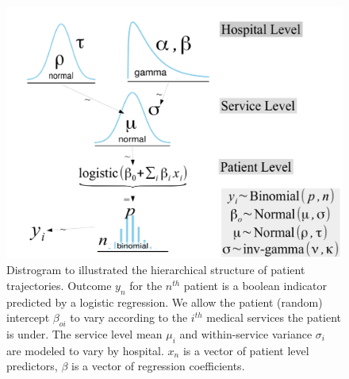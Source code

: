 \documentclass[11pt,notitlepage]{article}
\begin{document}
\begin{figure} %
 \vspace{-15pt}
 \includegraphics[scale=0.3]{Figures/Distrogram.pdf} 
  \vspace{-20pt}
 \caption{\footnotesize Distrogram to illustrated the hierarchical structure of patient trajectories. Outcome $y_n$ for the $n^{th}$ patient is a boolean indicator predicted by a logistic regression. We allow the patient (random) intercept $\beta_{oi}$ to vary according to the $i^{th}$ medical services the patient is under. The service level mean $\mu_i$ and within-service variance $\sigma_i$ are modeled to vary by hospital. $x_n$ is a vector of patient level predictors, $\beta$ is a vector of regression coefficients.}
 \vspace{-10pt}
 \label{fig:Distrogram}
\end{figure} 
\end{document}
